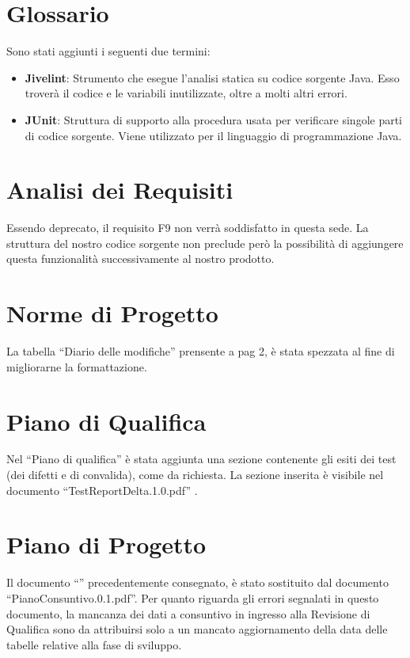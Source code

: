\section{Glossario}
Sono stati aggiunti i seguenti due termini: \\
\begin{itemize}
\item \textbf{Jivelint}: Strumento che esegue l'analisi statica su codice sorgente Java. Esso trover\`a il codice e le variabili inutilizzate, oltre a molti altri errori. \\
\item \textbf{JUnit}: Struttura di supporto alla procedura usata per verificare singole parti di codice sorgente. Viene utilizzato per il linguaggio di programmazione Java. 
\end{itemize}

\section{Analisi dei Requisiti}
Essendo deprecato, il requisito F9 non verr\`a soddisfatto in questa sede. La struttura del nostro codice sorgente non preclude per\`o la possibilit\`a di aggiungere questa funzionalit\`a successivamente al nostro prodotto.
\section{Norme di Progetto}
La tabella ``Diario delle modifiche'' prensente a pag 2, \`e stata spezzata al fine di migliorarne la formattazione.
\section{Piano di Qualifica}
Nel ``Piano di qualifica'' \`e stata aggiunta una sezione contenente gli esiti dei test (dei difetti e di convalida), come da richiesta. La sezione inserita \`e visibile nel documento ``TestReportDelta.1.0.pdf'' .


\section{Piano di Progetto}
Il documento ``\PdP'' precedentemente consegnato, \`e stato sostituito dal documento ``PianoConsuntivo.0.1.pdf''.
Per quanto riguarda gli errori segnalati in questo documento, la mancanza dei dati a consuntivo in ingresso alla Revisione di Qualifica sono da attribuirsi solo a un mancato aggiornamento della data delle tabelle relative alla fase di sviluppo. 
